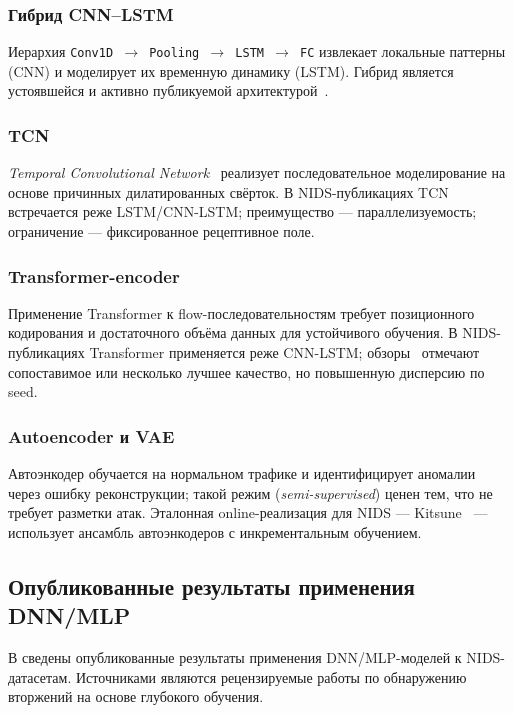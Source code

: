 \subsubsection{Гибрид CNN--LSTM}

Иерархия \texttt{Conv1D $\to$ Pooling $\to$ LSTM $\to$ FC} извлекает локальные
паттерны (CNN) и моделирует их временную динамику (LSTM). Гибрид является
устоявшейся и активно публикуемой
архитектурой~\cite{vinayakumar2019dl, ferrag2020dlcyber, ahmad2021nids}.

\subsubsection{TCN}

\emph{Temporal Convolutional Network}~\cite{bai2018tcn} реализует
последовательное моделирование на основе причинных дилатированных свёрток.
В NIDS-публикациях TCN встречается реже LSTM/CNN-LSTM; преимущество ---
параллелизуемость; ограничение --- фиксированное рецептивное поле.

\subsubsection{Transformer-encoder}

Применение Transformer к flow-последовательностям требует позиционного
кодирования и достаточного объёма данных для устойчивого обучения. В
NIDS-публикациях Transformer применяется реже CNN-LSTM;
обзоры~\cite{ferrag2020dlcyber, ahmad2021nids} отмечают сопоставимое или
несколько лучшее качество, но повышенную дисперсию по seed.

\subsubsection{Autoencoder и VAE}

Автоэнкодер обучается на нормальном трафике и идентифицирует аномалии
через ошибку реконструкции; такой режим (\emph{semi-supervised}) ценен
тем, что не требует разметки атак. Эталонная online-реализация для
NIDS --- Kitsune~\cite{mirsky2018kitsune} --- использует ансамбль
автоэнкодеров с инкрементальным обучением.

\subsection{Опубликованные результаты применения DNN/MLP}

В  сведены опубликованные результаты применения
DNN/MLP-моделей к NIDS-датасетам. Источниками являются рецензируемые работы
по обнаружению вторжений на основе глубокого обучения.

